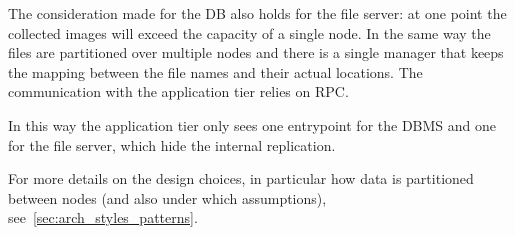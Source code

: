 \begin{description}
    The consideration made for the DB also holds for the file server: at one
    point the collected images will exceed the capacity of a single node.
    In the same way the files are partitioned over multiple nodes and there is
    a single manager that keeps the mapping between the file names and their
    actual locations. The communication with the application tier relies on RPC.
    
    In this way the application tier only sees one entrypoint for the DBMS and
    one for the file server, which hide the internal replication.
\end{description}

\noindent
For more details on the design choices, in particular how data is partitioned
between nodes (and also under which assumptions),
see~\ref{sec:arch_styles_patterns}.
